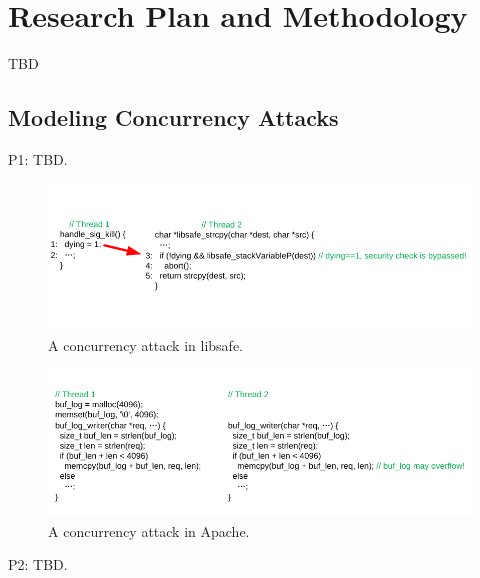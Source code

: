 \section{Research Plan and Methodology} \label{sec:rep}

TBD

\subsection{Modeling Concurrency Attacks} \label{sec:model}

P1: TBD.

\begin{figure}[t]
\centering
\includegraphics[width=0.99\columnwidth]{figures/libsafe}
\vspace{-.05in}
\caption{{A concurrency attack in libsafe.}} \label{fig:libsafe}
\vspace{-.05in}
\end{figure}

\begin{figure}[t]
\centering
\includegraphics[width=0.99\columnwidth]{figures/apache}
\vspace{-.05in}
\caption{{A concurrency attack in Apache.}} \label{fig:apache}
\vspace{-.05in}
\end{figure}

P2: TBD.

